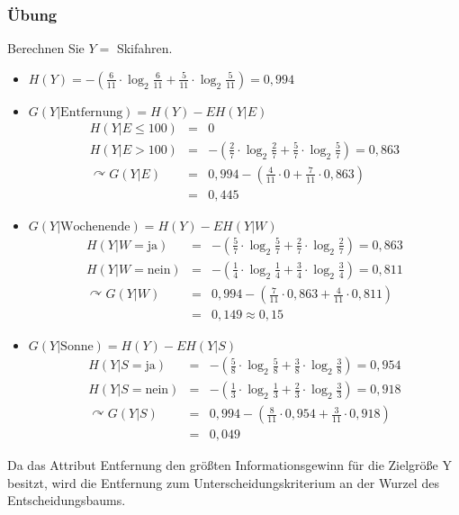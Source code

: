 \subsubsection{Übung}
Berechnen Sie \(Y = \) Skifahren.
\begin{itemize}
	\item \(H(Y) = -(\frac{6}{11} \cdot \log_2\frac{6}{11} + \frac{5}{11} \cdot \log_2\frac{5}{11}) = 0,994\)
	\item \(G(Y|\textrm{Entfernung}) = H(Y) - E H(Y|E)\)
			\begin{eqnarray*}
			 	H(Y|E \leq 100) &=& 0\\
			 	H(Y|E > 100) &=& -(\frac{2}{7} \cdot \log_2\frac{2}{7} + \frac{5}{7} \cdot \log_2\frac{5}{7}) = 0,863\\
			 	\curvearrowright G(Y|E) &=& 0,994 - (\frac{4}{11} \cdot 0 + \frac{7}{11} \cdot 0,863)\\
			 	&=& 0,445
			\end{eqnarray*}
	\item \(G(Y|\textrm{Wochenende}) = H(Y) - E H(Y|W)\)
			\begin{eqnarray*}
			 	H(Y|W = \textrm{ja}) &=& -(\frac{5}{7} \cdot \log_2\frac{5}{7} + \frac{2}{7} \cdot \log_2\frac{2}{7}) = 0,863\\
			 	H(Y|W = \textrm{nein}) &=& -(\frac{1}{4} \cdot \log_2\frac{1}{4} + \frac{3}{4} \cdot \log_2\frac{3}{4}) = 0,811\\
			 	\curvearrowright G(Y|W) &=& 0,994 - (\frac{7}{11} \cdot 0,863 + \frac{4}{11} \cdot 0,811)\\
			 	&=& 0,149 \approx 0,15
			\end{eqnarray*}
	\item \(G(Y|\textrm{Sonne}) = H(Y) - E H(Y|S)\)
			\begin{eqnarray*}
			 	H(Y|S = \textrm{ja}) &=& -(\frac{5}{8} \cdot \log_2\frac{5}{8} + \frac{3}{8} \cdot \log_2\frac{3}{8}) = 0,954\\
			 	H(Y|S = \textrm{nein}) &=& -(\frac{1}{3} \cdot \log_2\frac{1}{3} + \frac{2}{3} \cdot \log_2\frac{3}{3}) = 0,918\\
			 	\curvearrowright G(Y|S) &=& 0,994 - (\frac{8}{11} \cdot 0,954 + \frac{3}{11} \cdot 0,918)\\
			 	&=& 0,049
			\end{eqnarray*}
\end{itemize}

Da das Attribut Entfernung den größten Informationsgewinn für die Zielgröße Y besitzt, wird die Entfernung zum Unterscheidungskriterium an der Wurzel des Entscheidungsbaums.
\begin{figure}[htbp]
	\centering
\end{figure}

